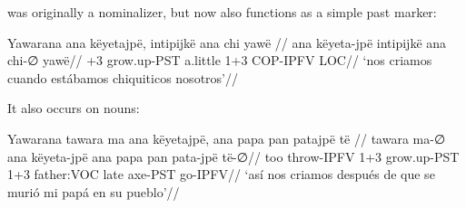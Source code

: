  was originally a nominalizer, but now also functions as a
simple past marker:

 Yawarana 
\begingl
\glpreamble ana këyetajpë, intipijkë ana chi yawë //
\gla ana këyeta-jpë intipijkë ana chi-∅ yawë//
+3 grow.up-PST a.little 1+3 COP-IPFV LOC//
\glft ‘nos criamos cuando estábamos chiquiticos nosotros’//  
\endgl 
\xe

It also occurs on nouns:

 Yawarana 
\begingl
\glpreamble tawara ma ana këyetajpë, ana papa pan patajpë të //
\gla tawara ma-∅ ana këyeta-jpë ana papa pan pata-jpë të-∅//
\glb too throw-IPFV 1+3 grow.up-PST 1+3 father:VOC late axe-PST go-IPFV//
\glft ‘así nos criamos después de que se murió mi papá en su pueblo’//  
\endgl 
\xe